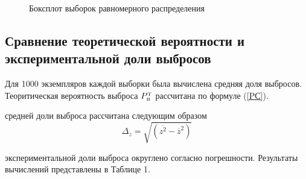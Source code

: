 \documentclass[12pt]{article}
\newcommand{\lskip}{\hfill\break}
\begin{document}
\begin{flushleft}
        \newpage

        \begin{figure}[h]
            \caption{Боксплот выборок равномерного распределения}
        \end{figure}

    \subsection{Сравнение теоретической вероятности и экспериментальной доли выбросов}

        Для 1000 экземпляров каждой выборки была вычислена средняя доля выбросов. Теоритическая вероятность выброса $P_{\text{\tiny{B}}}^{\text{\tiny{T}}}$ рассчитана по формуле (\ref{PС}). 
        \lskip

         средней доли выброса рассчитана следующим образом
        \begin{equation}
            \Delta_z = \sqrt{\left(\overline{z^2} - {\overline{z}}^2\right)}
            \label{delta}
        \end{equation}

         экспериментальной доли выброса округлено согласно погрешности. Результаты вычислений представлены в Таблице 1.


\end{flushleft}
\end{document}
